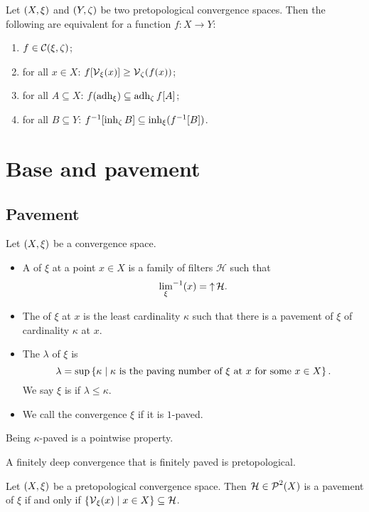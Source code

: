\begin{proposition}
Let $\left( X,\xi \right)$ and $\left( Y,\zeta \right)$ be two pretopological convergence spaces. Then the following are equivalent for a function $f: X\to Y$:
\begin{enumerate}
\item $f\in \operatorname{\mathcal{C}}(\xi, \zeta)$;
\item for all $x\in X$: $f[\operatorname{\mathcal{V}}_\xi(x)] \geq \operatorname{\mathcal{V}}_\zeta(f(x))$;
\item for all $A\subseteq X$: $f(\operatorname{adh}_\xi) \subseteq \operatorname{adh}_\zeta f[A]$;
\item for all $B\subseteq Y$: $f^{-1}[\operatorname{inh}_\zeta B] \subseteq \operatorname{inh}_\xi(f^{-1}[B])$.
\end{enumerate}
\end{proposition}

\section{Base and pavement}
\subsection{Pavement}
\begin{definition}
Let $\left( X,\xi \right)$ be a convergence space.
\begin{itemize}
\item A  of $\xi$ at a point $x\in X$ is a family of filters $\mathcal{H}$ such that
\[ {\lim_\xi}^{-1}(x) = \operatorname{\uparrow}\mathcal{H}. \]
\item The  of $\xi$ at $x$ is the least cardinality $\kappa$ such that there is a pavement of $\xi$ of cardinality $\kappa$ at $x$.
\item The  $\lambda$ of $\xi$ is
\[ \lambda = \sup\left\{ \kappa \;\middle|\; \text{$\kappa$ is the paving number of $\xi$ at $x$ for some $x\in X$} \right\}. \]
We say $\xi$ is  if $\lambda \leq \kappa$.
\item We call the convergence $\xi$  if it is $1$-paved.
\end{itemize}
\end{definition}
Being $\kappa$-paved is a pointwise property.

\begin{proposition}
A finitely deep convergence that is finitely paved is pretopological.
\end{proposition}

\begin{lemma}
Let $\left( X,\xi \right)$ be a pretopological convergence space. Then $\mathcal{H}\in\operatorname{\mathcal{P}}^2(X)$ is a pavement of $\xi$ \textup{if and only if} $\left\{ \operatorname{\mathcal{V}}_\xi(x) \;\middle|\; x\in X \right\} \subseteq \mathcal{H}$.
\end{lemma}

